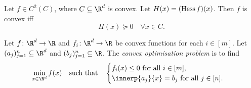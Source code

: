 \begin{fact*}
    Let $f \in C^2(C)$, where $C \subseteq \R^d$ is convex.
    Let $H(x) = (\operatorname{Hess} f)(x)$.
    Then $f$ is convex iff \[
        H(x) \succeq 0 \quad \forall x \in C.
    \]
\end{fact*}

\begin{definition*} \label{def:convexopt}
    Let $f\colon \R^d \to \R$ and $f_i\colon \R^d \to \R$ be convex
    functions for each $i \in [m]$.
    Let $(a_j)_{j=1}^n \subseteq \R^d$ and $(b_j)_{j=1}^n \subseteq \R$.
    The \emph{convex optimisation problem} is to find \[
        \min_{x \in \R^d} f(x) \quad \text{such that} \quad \begin{cases}
            f_i(x) \le 0 \text{ for all } i \in [m], \\
            \innerp{a_j}{x} = b_j \text{ for all } j \in [n].
        \end{cases}
    \]
\end{definition*}

